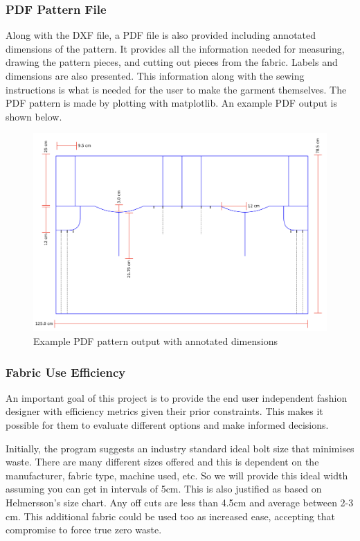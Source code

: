 \subsubsection{PDF Pattern File}
Along with the DXF file, a PDF file is also provided including annotated dimensions of the pattern. It provides all the information needed for measuring, drawing the pattern pieces, and cutting out pieces from the fabric. Labels and dimensions are also presented. This information along with the sewing instructions is what is needed for the user to make the garment themselves. The PDF pattern is made by plotting with matplotlib. An example PDF output is shown below.
\begin{figure} [H]
    \centering
    \includegraphics[width = \textwidth]{Images/example pdf output.png}
    \caption{Example PDF pattern output with annotated dimensions}
    \label{fig:pdf output}
\end{figure}


\subsubsection{Fabric Use Efficiency}
An important goal of this project is to provide the end user independent fashion designer with efficiency metrics given their prior constraints. This makes it possible for them to evaluate different options and make informed decisions.

Initially, the program suggests an industry standard ideal bolt size that minimises waste. There are many different sizes offered and this is dependent on the manufacturer, fabric type, machine used, etc. So we will provide this ideal width assuming you can get in intervals of 5cm. This is also justified as based on Helmersson's size chart. Any off cuts are less than 4.5cm and average between 2-3 cm. This additional fabric could be used too as increased ease, accepting that compromise to force true zero waste.

